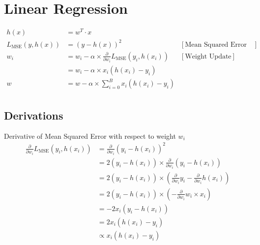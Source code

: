 \section{Linear Regression}

\begin{align*}
    h(x) &= w^T \cdot x &\\ 
    L_{\text{MSE}}(y, h(x)) &= (y-h(x))^2 & [\text{Mean Squared Error Loss}]\\
    w_i &= w_i - \alpha \times \frac{\partial}{\partial w_i} L_{\text{MSE}}(y_i, h(x_i)) & [\text{Weight Update}]\\
    &= w_i - \alpha \times x_i(h(x_i) - y_i)\\
    w &= w -\alpha \times \sum^{B}_{i=0} x_i(h(x_i) - y_i)\\
\end{align*}



\subsection{Derivations}
Derivative of Mean Squared Error with respect to weight $w_i$\\

\begin{align*}
    \frac{\partial}{\partial w_i} L_{\text{MSE}}(y_i, h(x_i)) &= \frac{\partial}{\partial w_i} (y_i - h(x_i))^2\\
    &= 2(y_i - h(x_i)) \times \frac{\partial}{\partial w_i} (y_i - h(x_i))\\
    &= 2(y_i - h(x_i)) \times \left(\frac{\partial}{\partial w_i} y_i - \frac{\partial}{\partial w_i}h(x_i)\right)\\
    &= 2(y_i - h(x_i)) \times \left(-\frac{\partial}{\partial w_i}w_i \times x_i\right)\\
    &= -2x_i(y_i - h(x_i))\\
    &= 2x_i(h(x_i)-y_i)\\
    &\propto x_i(h(x_i)-y_i)\\
\end{align*}
